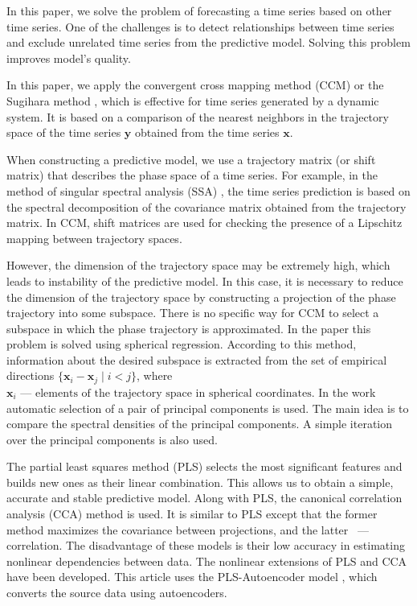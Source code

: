 \documentclass[bst/sn-mathphys]{sn-jnl}%
\newcommand{\bx}{\ensuremath{\mathbf{x}}}
\newcommand{\by}{\mathbf{y}}
\theoremstyle{thmstyleone}%
\theoremstyle{thmstyletwo}%
\theoremstyle{thmstylethree}%
\begin{document}
In this paper, we solve the problem of forecasting a time series based on other time series.
One of the challenges is to detect relationships between time series and exclude unrelated time series from the predictive model.
Solving this problem improves model's quality.

In this paper, we apply the convergent cross mapping method (CCM) or the Sugihara method \cite{Sugihara90, sugihara1990nonlinear}, 
which is effective for time series generated by a dynamic system.
It is based on a comparison of the nearest neighbors in the trajectory space of the time series $\by$ obtained from the time series $\bx$.

When constructing a predictive model, we use a trajectory matrix (or shift matrix) that describes the phase space of a time series.
For example, in the method of singular spectral analysis (SSA) \cite {golyandina2005ssa, golyandina2001analysis, zhigljavsky2010singular}, the time series prediction is based on the spectral decomposition of the covariance matrix obtained from the trajectory matrix.
In CCM, shift matrices are used for checking the presence of a Lipschitz mapping between trajectory spaces.

However, the dimension of the trajectory space may be extremely high, 
which leads to instability of the predictive model.
In this case, it is necessary to reduce the dimension of the trajectory space by constructing a projection of the phase trajectory into some subspace. 
There is no specific way for CCM to select a subspace in which the phase trajectory is approximated.
In the paper \cite{usmanova2020sphere_regr} this problem is solved using spherical regression. 
According to this method, information about the desired subspace is extracted from the set of empirical directions $\{ \bx_i - \bx_j \mid i < j \}$, where $\bx_i \text{~--- elements of the trajectory space in spherical coordinates}$. 
In the work \cite{alexandrov2005automatic} automatic selection of a pair of principal components is used.
The main idea is to compare the spectral densities of the principal components. 
A simple iteration over the principal components \cite{usmanova2019dependencies} is also used.

The partial least squares method (PLS) \cite{rosipal2011nonlinear, rosipal2005overview} selects the most significant features and builds new ones as their linear combination.
This allows us to obtain a simple, accurate and stable predictive model.
Along with PLS, the canonical correlation analysis (CCA) \cite {hardoon2004canonical} method is used.
It is similar to PLS except that the former method maximizes the covariance between projections, and the latter ~--- correlation.
The disadvantage of these models is their low accuracy in estimating nonlinear dependencies between data.
The nonlinear extensions of PLS \cite{qin1992nonlinear} and CCA \cite{andrew2013deep} have been developed.
This article uses the PLS-Autoencoder model \cite{wiering2013neural}, which converts the source data using autoencoders.
\end{document}
